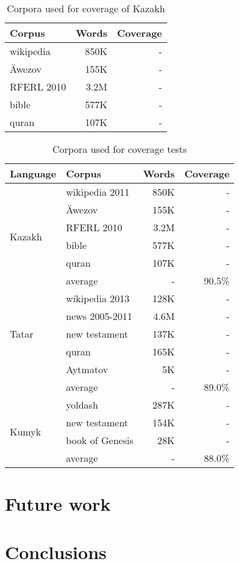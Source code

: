 \documentclass[a4paper,11pt,twocolumn]{article}
\begin{document}
\begin{table}
\begin{center}
\begin{tabular}{lrr}
\textbf{Corpus} & \textbf{Words} & \textbf{Coverage} \\
\hline
wikipedia & 850K &  - \\
Äwezov & 155K & - \\
RFERL 2010 & 3.2M & - \\
bible & 577K & - \\
quran & 107K & - \\
\hline
\end{tabular}
 \caption{Corpora used for coverage of Kazakh}
 \label{table:corpora-kaz}
\end{center}
\end{table}

\begin{table}
\begin{center}
\begin{tabular}{llrr}
\toprule
\textbf{Language} & \textbf{Corpus} & \textbf{Words} & \textbf{Coverage} \\
\midrule
\multirow{6}{*}{Kazakh} & wikipedia 2011& 850K &  - \\
	& Äwezov & 155K & - \\
	& RFERL 2010 & 3.2M & - \\
	& bible & 577K & - \\
	& quran & 107K & - \\\cline{2-4}
	& average & - & 90.5\% \\
\midrule
\multirow{5}{*}{Tatar} & wikipedia 2013 & 128K &  - \\
	& news 2005-2011 & 4.6M & - \\
	& new testament & 137K & - \\
	& quran & 165K & - \\
	& Aytmatov & 5K & - \\\cline{2-4}
	& average & - & 89.0\% \\
\midrule
\multirow{4}{*}{Kumyk} & yoldash & 287K &  - \\
	& new testament & 154K & - \\
	& book of Genesis & 28K & - \\\cline{2-4}
	& average & - & 88.0\% \\
\bottomrule
\end{tabular}
 \caption{Corpora used for coverage tests}
 \label{table:corpora}
\end{center}
\end{table}



\section{Future work}


\section{Conclusions}




\end{document}
